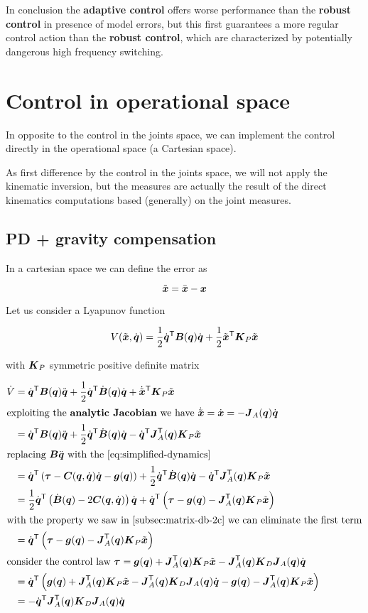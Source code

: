 In conclusion the \textbf{adaptive control} offers worse performance than the \textbf{robust control} in presence of model errors, but this first guarantees a more regular control action than the \textbf{robust control}, which are characterized by potentially dangerous high frequency switching.


\section{Control in operational space}

In opposite to the control in the joints space, we can implement the control directly in the operational space (a Cartesian space).

As first difference by the control in the joints space, we will not apply the kinematic inversion, but the measures are actually the result of the direct kinematics computations based (generally) on the joint measures.

\subsection{PD + gravity compensation}

In a cartesian space we can define the error as

\[
	\tilde{\boldsymbol{x}} = \bar{\boldsymbol{x}} - \boldsymbol{x}
\]

Let us consider a Lyapunov function

\[
	V(\tilde{\boldsymbol{x}},\dot{\boldsymbol{q}}) = \frac{1}{2} \dot{\boldsymbol{q}}^{\mathsf{T}}\boldsymbol{B}(\boldsymbol{q})\dot{\boldsymbol{q}} + \frac{1}{2}\tilde{\boldsymbol{x}}^{\mathsf{T}} \boldsymbol{K}_P \tilde{\boldsymbol{x}}
\]

with $\boldsymbol{K}_P$ symmetric positive definite matrix

\begin{align*}
    \dot V &= \dq^\trans \B(\q) \ddq + \frac{1}{2} \dq^\trans \dB(\q) \dq + \dxe^\trans \matr K_P \xe \\
	\intertext{exploiting the \textbf{analytic Jacobian}\index{analytic Jacobian} we have $\dxe=\dx=-\J_A(\q)\dq$}
	&= \dq^\trans \B(\q) \ddq + \frac{1}{2} \dq^\trans \dB(\q) \dq - \dq^\trans \J_A^\trans(\q)\K_P \xe \\
    \intertext{replacing $\B\ddq$ with the \autoref{eq:simplified-dynamics}}
	&= \dq^\trans \left( \vect\tau - \C(\q,\dq)\dq - \g(\q) \right) + \frac{1}{2} \dq^\trans \dB(\q) \dq - \dq^\trans \J_A^\trans(\q)\K_P \xe \\
	&= \frac{1}{2} \dq^\trans \left(\dB(\q) - 2\C(\q,\dq) \right) \dq + \dq^\trans \left( \vect\tau - \g(\q)  - \J_A^\trans(\q)\K_P \xe \right) \\
	\intertext{with the property we saw in \autoref{subsec:matrix-db-2c} we can eliminate the first term}
	&= \dq^\trans \left( \vect\tau - \g(\q)  - \J_A^\trans(\q)\K_P \xe \right) \\
    \intertext{consider the control law $\vect\tau = \g(\q) + \J_A^\trans(\q) \K_P \xe - \J_A^\trans(\q) \K_D \J_A(\q) \dq$}
	&= \dq^\trans \left( \g(\q) + \J_A^\trans(\q) \K_P \xe - \J_A^\trans(\q) \K_D \J_A(\q) \dq - \g(\q)  - \J_A^\trans(\q)\K_P \xe \right) \\
	&= - \dq^\trans \J_A^\trans(\q) \K_D \J_A(\q) \dq
\end{align*}

